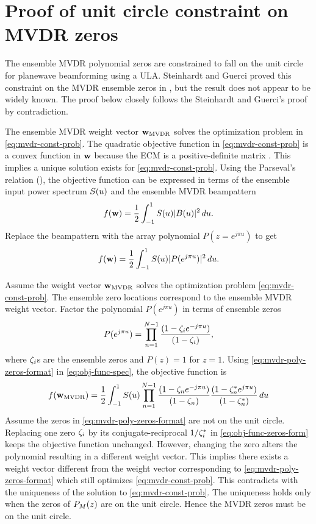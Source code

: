 \chapter{Proof of unit circle constraint on MVDR zeros}
\label{sec:apdx-mvdr-zeros}
The ensemble MVDR polynomial zeros are constrained to fall on the unit circle
for planewave beamforming using a ULA. Steinhardt and Guerci proved this
constraint on the MVDR ensemble zeros in \cite{steinhardt2004stap},
but the result does not appear to be widely known. The proof below
closely follows the Steinhardt and Guerci's proof by contradiction.

The ensemble MVDR weight vector ${\bf w}_{\rm MVDR}$ solves the optimization problem in
\eqref{eq:mvdr-const-prob}. The quadratic objective function in
\eqref{eq:mvdr-const-prob} is a convex function in ${\bf w}$ because the
ECM is a positive-definite matrix \cite{vtree2002oap}. This implies a
unique solution exists for \eqref{eq:mvdr-const-prob}. Using the Parseval's relation (\cite[Sec.~5.4.1.3]{vtree2002oap}), the objective
function can be expressed in terms of the ensemble input power spectrum
$S(u)$ and the ensemble MVDR beampattern
\begin{equation}
\label{eq:obj-func-spec}
f({\bf w}) = \frac{1}{2}\int_{-1}^{1}S(u) |B(u)|^2 \,du.
\end{equation}
Replace the beampattern with the array polynomial
${P(z = e^{j\pi u})}$ to get
\begin{equation}
\label{eq:obj-func-poly}
f({\bf w}) = \frac{1}{2}\int_{-1}^{1}S(u) |P(e^{j\pi u})|^2 \,du.
\end{equation}

Assume the weight vector ${\bf w}_{\rm MVDR}$ solves the optimization problem \eqref{eq:mvdr-const-prob}. The ensemble zero locations correspond to the ensemble MVDR weight vector. Factor the polynomial $P(e^{j\pi u})$ in terms of ensemble zeros
\begin{equation}
  \label{eq:mvdr-poly-zeros-format}
P(e^{j\pi u}) = \prod\limits_{n=1}^{N-1}\frac{(1 - \zeta_i e^{-j\pi u})}{(1 - \zeta_i)},
\end{equation}
where $\zeta_i$s are the ensemble zeros and $P(z) = 1$ for
$z = 1$.
Using \eqref{eq:mvdr-poly-zeros-format} in \eqref{eq:obj-func-spec},
the objective function is
\begin{equation}
\label{eq:obj-func-zeros-form}
f({\bf w}_{\rm MVDR}) = \frac{1}{2}\int_{-1}^{1}S(u) \prod\limits_{n=1}^{N-1}\frac{(1 -
   \zeta_n e^{-j\pi u})}{(1 - \zeta_n)} \frac{(1 - \zeta_n^*e^{j\pi u})}{(1 - \zeta_n^*)}\,du
\end{equation}
Assume the zeros in \eqref{eq:mvdr-poly-zeros-format} are not on the
unit circle. Replacing one zero $\zeta_i$ by its conjugate-reciprocal
$1/\zeta_i^*$ in \eqref{eq:obj-func-zeros-form} keeps the objective
function unchanged. However, changing the zero alters the polynomial resulting in a
different weight vector. This implies there exists a weight vector
different from the weight vector corresponding to
\eqref{eq:mvdr-poly-zeros-format} which still optimizes
\eqref{eq:mvdr-const-prob}. This contradicts with the uniqueness of
the solution to \eqref{eq:mvdr-const-prob}. The uniqueness holds only
when the zeros of ${P}_M(z)$ are on the unit circle. Hence the MVDR
zeros must be on the unit circle.

